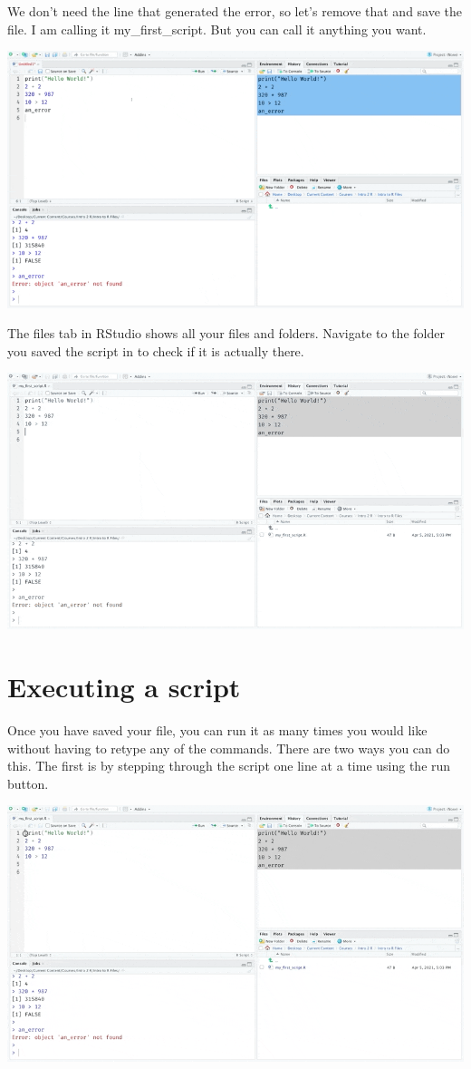 \documentclass[
]{book}
\begin{document}
We don't need the line that generated the error, so let's remove that and save the file. I am calling it my\_first\_script. But you can call it anything you want.

\includegraphics{assets/ch_1-setup/gifs/save_file.gif}

The files tab in RStudio shows all your files and folders. Navigate to the folder you saved the script in to check if it is actually there.

\includegraphics{assets/ch_1-setup/gifs/saved_file.gif}

\hypertarget{executing-a-script}{%
\section{Executing a script}\label{executing-a-script}}

Once you have saved your file, you can run it as many times you would like without having to retype any of the commands. There are two ways you can do this. The first is by stepping through the script one line at a time using the run button.

\includegraphics{assets/ch_1-setup/gifs/run_lines.gif}
\end{document}
